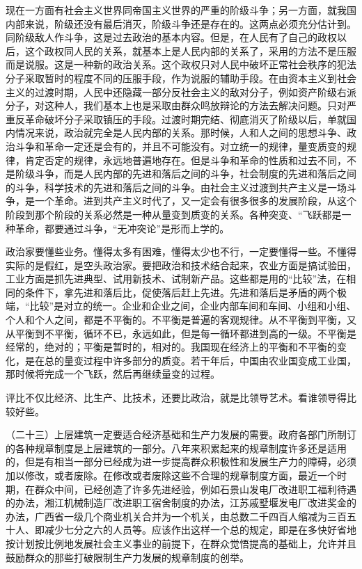 现在一方面有社会主义世界同帝国主义世界的严重的阶级斗争；另一方面，就我国内部来说，阶级还没有最后消灭，阶级斗争还是存在的。这两点必须充分估计到。同阶级敌人作斗争，这是过去政治的基本内容。但是，在人民有了自己的政权以后，这个政权同人民的关系，就基本上是人民内部的关系了，采用的方法不是压服而是说服。这是一种新的政治关系。这个政权只对人民中破坏正常社会秩序的犯法分子采取暂时的程度不同的压服手段，作为说服的辅助手段。在由资本主义到社会主义的过渡时期，人民中还隐藏一部分反社会主义的敌对分子，例如资产阶级右派分子，对这种人，我们基本上也是采取由群众鸣放辩论的方法去解决问题。只对严重反革命破坏分子采取镇压的手段。过渡时期完结、彻底消灭了阶级以后，单就国内情况来说，政治就完全是人民内部的关系。那时候，人和人之间的思想斗争、政治斗争和革命一定还是会有的，并且不可能没有。对立统一的规律，量变质变的规律，肯定否定的规律，永远地普遍地存在。但是斗争和革命的性质和过去不同，不是阶级斗争，而是人民内部的先进和落后之间的斗争，社会制度的先进和落后之间的斗争，科学技术的先进和落后之间的斗争。由社会主义过渡到共产主义是一场斗争，是一个革命。进到共产主义时代了，又一定会有很多很多的发展阶段，从这个阶段到那个阶段的关系必然是一种从量变到质变的关系。各种突变、“飞跃都是一种革命，都要通过斗争，“无冲突论”是形而上学的。

政治家要懂些业务。懂得太多有困难，懂得太少也不行，一定要懂得一些。不懂得实际的是假红，是空头政治家。要把政治和技术结合起来，农业方面是搞试验田，工业方面是抓先进典型、试用新技术、试制新产品。这些都是用的“比较”法，在相同的条件下，拿先进和落后比，促使落后赶上先进。先进和落后是矛盾的两个极端，“比较”是对立的统一。企业和企业之间，企业内部车间和车间、小组和小组、个人和个人之间，都是不平衡的。不平衡是普遍的客观规律。从不平衡到平衡，又从平衡到不平衡，循环不已，永远如此，但是每一循环都进到高的一级。不平衡是经常的，绝对的；平衡是暂时的，相对的。我国现在经济上的平衡和不平衡的变化，是在总的量变过程中许多部分的质变。若干年后，中国由农业国变成工业国，那时候将完成一个飞跃，然后再继续量变的过程。

评比不仅比经济、比生产、比技术，还要比政治，就是比领导艺术。看谁领导得比较好些。

（二十三）上层建筑一定要适合经济基础和生产力发展的需要。政府各部门所制订的各种规章制度是上层建筑的一部分。八年来积累起来的规章制度许多还是适用的，但是有相当一部分已经成为进一步提高群众积极性和发展生产力的障碍，必须加以修改，或者废除。在修改或者废除这些不合理的规章制度方面，最近一个时期，在群众中间，已经创造了许多先进经验，例如石景山发电厂改进职工福利待遇的办法，湘江机械制造厂改进职工宿舍制度的办法，江苏戚墅堰发电厂改进奖金的办法，广西省一级几个商业机关合并为一个机关，由总数二千四百人缩减为三百五十人、即减少七分之六的人员等。应该作出这样一个总的规定，即是在多快好省地按计划按比例地发展社会主义事业的前提下，在群众觉悟提高的基础上，允许并且鼓励群众的那些打破限制生产力发展的规章制度的创举。

